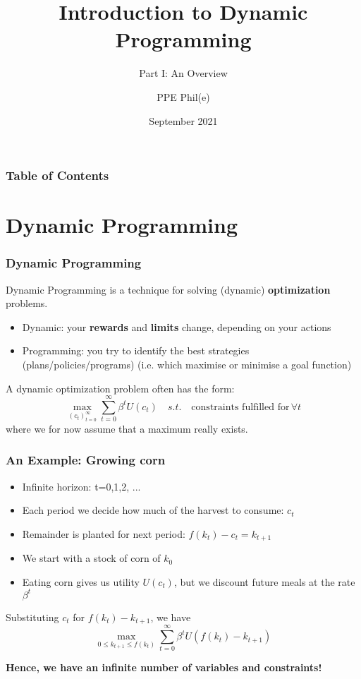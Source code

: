 \documentclass[aspectratio=169]{beamer}
\title[Dynamic Programming Part I] %
{Introduction to Dynamic Programming}
\subtitle{Part I: An Overview}
\author[PPE Phil(e)]
{PPE Phil(e)\inst{1}}
\institute[] %
{
  \inst{1}%
  material @ https://github.com/PPEphile
}
\date[2021] %
{September 2021}
\begin{document}
\frame{\titlepage}

\begin{frame}
\frametitle{Table of Contents}
\tableofcontents
\end{frame}

\section{Dynamic Programming}

\begin{frame}
\frametitle{Dynamic Programming}
Dynamic Programming is a technique for solving (dynamic) \textbf{optimization} problems.

\begin{itemize}
	\item Dynamic: your \textbf{rewards} and \textbf{limits} change, depending on your actions
	\item Programming: you try to identify the best strategies (plans/policies/programs) (i.e. which maximise or minimise a goal function)
\end{itemize}


A dynamic optimization problem often has the form:
\begin{equation}
	\max_{(c_t)^{\infty}_{t=0}} \sum^{\infty}_{t=0} \beta^t U(c_t) \quad s.t. \quad \textrm{constraints fulfilled for} \, \forall t
\end{equation}
where we for now assume that a maximum really exists.
\end{frame}

\begin{frame}
\frametitle{An Example: Growing corn}
\begin{itemize}
	\item Infinite horizon: t=0,1,2, ...
	\item Each period we decide how much of the harvest to consume: $c_t$
	\item Remainder is planted for next period: $f(k_t)-c_t=k_{t+1}$
	\item We start with a stock of corn of $k_0$
	\item Eating corn gives us utility $U(c_t)$, but we discount future meals at the rate $\beta^t$
\end{itemize}

Substituting $c_t$ for $f(k_t) - k_{t+1}$, we have
\begin{equation}
	\max_{0 \leq k_{t+1} \leq f(k_t)} \sum^{\infty}_{t=0} \beta^t U(f(k_t) - k_{t+1})
\end{equation}

\color{red}\textbf{Hence, we have an infinite number of variables and constraints!}
\end{frame}
\end{document}

